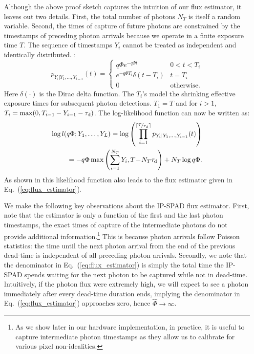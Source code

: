 Although the above proof sketch captures the intuition of our flux
estimator, it leaves out two details. First, the total number of photons
$N_T$ is itself a random variable. Second, the times of capture of
future photons are constrained by the timestamps of preceding photon arrivals
because we operate in a finite exposure time $T$. The sequence of timestamps $Y_i$
cannot be treated as independent and identically distributed. :
\begin{equation}
p_{Y_i | Y_{1},\dots,Y_{i-1}}(t)=\begin{cases}
q\Phi e^{-q\Phi t} & 0< t< T_i\\
e^{-q\Phi T_i} \delta(t-T_i) & t = T_i\\
0 & \mbox{otherwise.}
\end{cases}\nonumber 
\end{equation}
Here $\delta(\cdot)$ is the Dirac delta function.  The $T_i$'s model the
shrinking effective exposure times for subsequent photon detections.
$T_1 = T$ and for $i>1$, 
$T_i = \max(0,T_{i-1} - Y_{i-1}-\tau_\text{d})$.
The log-likelihood function can now be written as:
\begin{align*}
  \log l(q\Phi; Y_1,\ldots,Y_{L}) = \log \left( \prod_{i=1}^{\lceil\nicefrac{T}{\tau_\text{d}}\rceil} p_{Y_i | Y_{1},\dots,Y_{i-1}}(t) \right) \\
  \!\!= - q\Phi \max\left(\sum_{i=1}^{N_T}Y_i,T\!-\!N_T\tau_\text{d}\right) + N_T \log q\Phi.
\end{align*}
As shown in \nolink{\ref{suppl:MLE_conditional_derivation}} this likelihood function also
leads to the flux estimator given in Eq.~(\ref{eq:flux_estimator}).

We make the following key observations about the IP-SPAD flux estimator.
First, note that the estimator is only a function of the first and the last
photon timestamps, the exact times of capture of the intermediate photons do
not provide additional information.\footnote{As we show later in our hardware
implementation, in practice, it is useful to capture intermediate photon
timestamps as they allow us to calibrate for various pixel non-idealities.}
This is because photon arrivals follow Poisson statistics: the time until the
next photon arrival from the end of the previous dead-time is independent of
all preceding photon arrivals. Secondly, we note that the denominator in
Eq.~(\ref{eq:flux_estimator}) is simply the total time the IP-SPAD spends
waiting for the next photon to be captured while not in dead-time. Intuitively,
if the photon flux were extremely high, we will expect to see a photon
immediately after every dead-time duration ends, implying the denominator in
Eq.~(\ref{eq:flux_estimator}) approaches zero, hence $\widehat{\Phi}
\rightarrow \infty$.

